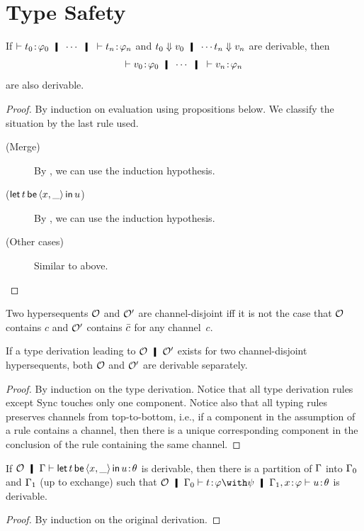 \section{Type Safety}

 \begin{proposition}[Safety]
  \label{safety}
  If $\tr \tj{t_0}{\phi_0} \hmid \cdots \hmid \tr \tj{t_n}{\phi_n}$ and
  $t_0\eval v_0\hmid \cdots t_n\eval v_n$ are
  derivable, then
  \[
   \tr\tj{v_0}{\phi_0} \hmid \cdots \hmid \tr \tj{v_n}{\phi_n}
  \]
  are also derivable.
 \end{proposition}
 \begin{proof}
  By induction on evaluation using propositions below.
  We classify the situation by the last rule used.
  \begin{description}
   \item[(Merge)]
	By , we can use the induction hypothesis.
   \item[($\mathsf{let }\,{t}\,\mathsf{ be }\,{\langle{x,\_}\rangle}\,\mathsf{ in }\,{u}$)]
	By , we can use the induction hypothesis.
   \item[(Other cases)]
	Similar to above.
  \end{description}
 \end{proof}

 Two hypersequents $\mathcal{O}$ and $\mathcal{O}'$ are channel-disjoint iff
 it is not the case that $\mathcal{O}$ contains $c$ and $\mathcal{O}'$ contains
 $\bar{c}$ for any channel~$c$.
 \begin{proposition}[Split]
  \label{split}
  If a type derivation leading to $\hypert\hmid \hypert'$ exists for two
  channel-disjoint
  hypersequents,
  both $\mathcal{O}$ and $\mathcal{O}'$ are derivable separately.
 \end{proposition}
 \begin{proof}
  By induction on the type derivation.  Notice that all type derivation
  rules except Sync touches only one component.  Notice also that all
  typing rules preserves channels from top-to-bottom, i.e., if a
  component in the assumption of a rule contains a channel, then there
  is a unique corresponding component in the conclusion of the rule
  containing the same channel.
 \end{proof}

 \begin{proposition}
  \label{inv-with-l}
  If $\hypert\hmid \G\tr\tj{\letin t {\lpair{x,\_}} u}\theta$
  is derivable, then there is a partition of $\Gamma$ into $\Gamma_0$ and $\Gamma_1$
  (up to exchange) such that $\hypert\hmid \G_0\tr \tj t {\phi\with\psi}
  \hmid \G_1,\tj{x}{\phi}\tr\tj u \theta$ is derivable.
 \end{proposition}
 \begin{proof}
   By induction on the original derivation.
 \end{proof}

